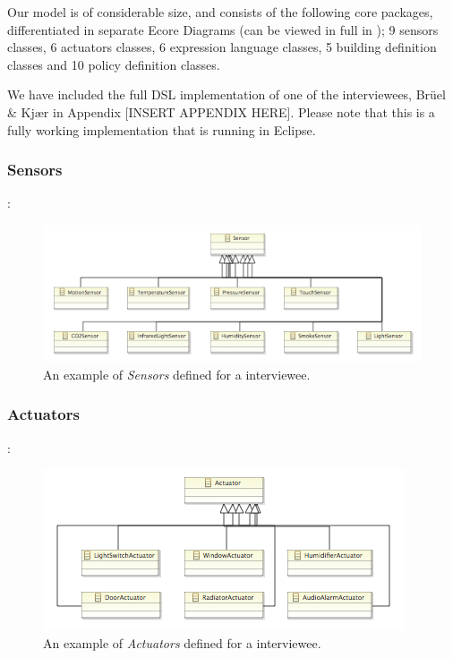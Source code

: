 \documentclass{llncs}
\begin{document}
Our model is of considerable size, and consists of the following core packages, differentiated in separate Ecore Diagrams (can be viewed in full in ); 9 sensors classes, 6 actuators classes, 6 expression language classes, 5 building definition classes and 10 policy definition classes.

We have included the full DSL implementation of one of the interviewees, Br\"{u}el \& Kj\ae r in Appendix [INSERT APPENDIX HERE]. Please note that this is a fully working implementation that is running in Eclipse.

\subsubsection{Sensors}:
\begin{figure}
	\centering
    \includegraphics[scale=0.7]{ecore-sensors.png} 
	\caption{An example of \textit{Sensors} defined for a interviewee.}
	\label{fig:ecore-sensors}
\end{figure}

\pagebreak
\subsubsection{Actuators}:
\begin{figure}
	\centering
    \includegraphics[scale=0.7]{ecore-actuators.png}   
	\caption{An example of \textit{Actuators} defined for a interviewee.}
	\label{fig:ecore-actuators}
\end{figure}
\end{document}
